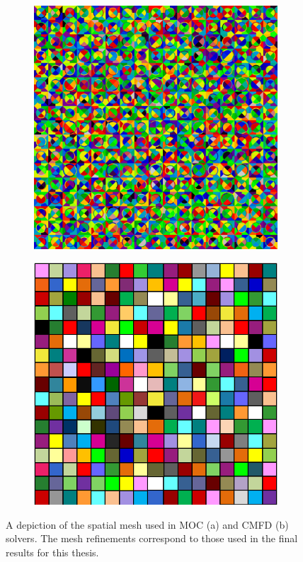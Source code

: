 \begin{figure}[h!]
	\centering
	\begin{subfigure}{0.45\textwidth}
		\centering
		\includegraphics[width=\linewidth]{figures/old3_moc_mesh.PNG}
		\caption{}
		\label{fig:cmfd-mesh-a}
	\end{subfigure}
	\begin{subfigure}{0.45\textwidth}
		\centering
		\includegraphics[width=\linewidth]{figures/cmfd_mesh.PNG}
		\caption{}
		\label{fig:cmfd-mesh-b}
	\end{subfigure}
	\caption[]{A depiction of the spatial mesh used in \ac{MOC} (a) and \ac{CMFD} (b) solvers. The mesh refinements correspond to those used in the final results for this thesis.}
	\label{fig:cmfd-mesh}
\end{figure}

